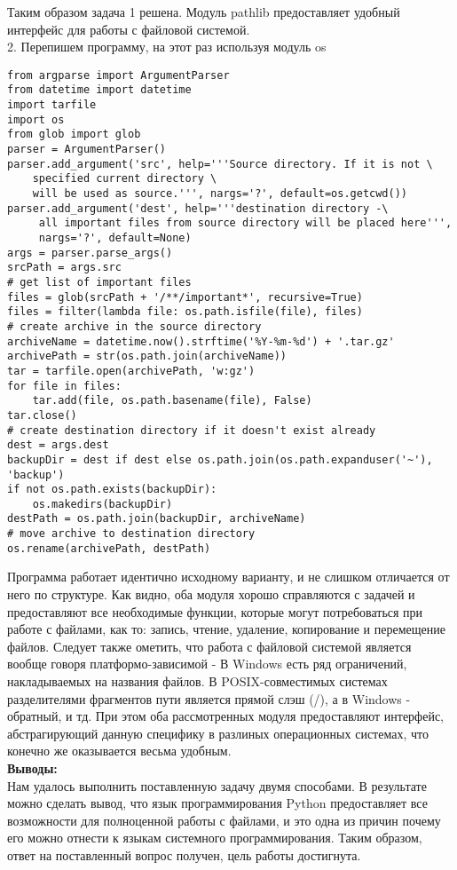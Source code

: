 \documentclass[12pt]{article}
\begin{document}
Таким образом задача 1 решена. Модуль pathlib предоставляет удобный интерфейс для работы с файловой системой.\\

2. Перепишем программу, на этот раз используя модуль os
\begin{verbatim}
from argparse import ArgumentParser
from datetime import datetime
import tarfile
import os
from glob import glob
parser = ArgumentParser()
parser.add_argument('src', help='''Source directory. If it is not \
	specified current directory \
	will be used as source.''', nargs='?', default=os.getcwd())
parser.add_argument('dest', help='''destination directory -\
	 all important files from source directory will be placed here''',
	 nargs='?', default=None)
args = parser.parse_args()
srcPath = args.src
# get list of important files
files = glob(srcPath + '/**/important*', recursive=True)
files = filter(lambda file: os.path.isfile(file), files)
# create archive in the source directory
archiveName = datetime.now().strftime('%Y-%m-%d') + '.tar.gz'
archivePath = str(os.path.join(archiveName))
tar = tarfile.open(archivePath, 'w:gz')
for file in files:
	tar.add(file, os.path.basename(file), False)
tar.close()
# create destination directory if it doesn't exist already
dest = args.dest
backupDir = dest if dest else os.path.join(os.path.expanduser('~'), 'backup')
if not os.path.exists(backupDir):
	os.makedirs(backupDir)
destPath = os.path.join(backupDir, archiveName)
# move archive to destination directory
os.rename(archivePath, destPath)
\end{verbatim}
Программа работает идентично исходному варианту, и не слишком отличается от него по структуре. Как видно, оба модуля хорошо справляются с задачей и предоставляют все необходимые функции, которые могут потребоваться при работе с файлами, как то: запись, чтение, удаление, копирование и перемещение файлов. Следует также ометить, что работа с файловой системой является вообще говоря платформо-зависимой - В Windows есть ряд ограничений, накладываемых на названия файлов. В POSIX-совместимых системах разделителями фрагментов пути является прямой слэш (/), а в Windows - обратный, и тд. При этом оба рассмотренных модуля предоставляют интерфейс, абстрагирующий данную специфику в разлиных операционных системах, что конечно же оказывается весьма удобным. \\

\textbf{Выводы:}\\
Нам удалось выполнить поставленную задачу двумя способами.
В результате можно сделать вывод, что язык программирования Python предоставляет все возможности для полноценной работы с файлами, и это одна из причин почему его можно отнести к языкам системного программирования.
Таким образом, ответ на поставленный вопрос получен, цель работы достигнута.
\end{document}
